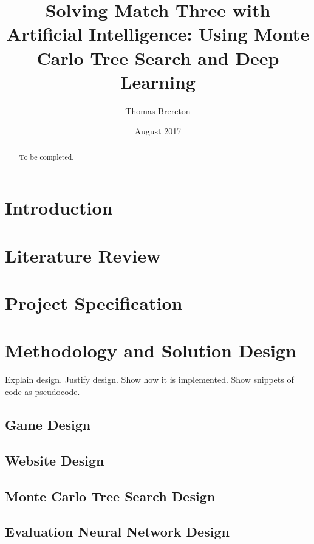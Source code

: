 \documentclass{bhamthesis}
\title{Solving Match Three with Artificial Intelligence: Using Monte Carlo Tree Search and Deep Learning}
\author{Thomas Brereton}
\date{August 2017}  %
\makeatletter
\theoremstyle{definition}
\newcommand{\makecrestcover}{%
\begin{titlepage}
\centering\singlespacing
\vspace*{1cm}
{\huge\bfseries University of Birmingham\par}
\vspace*{2cm}
\texttt{[image: crest]}\par
\vspace*{\stretch{1}}
{\Huge\bfseries
\@author\par
\vspace{1cm}
\@title\par}
\vspace*{\stretch{1}}
{\Large\@date\par}
\end{titlepage}
}
\makeatother
\begin{document}
\frontmatter

\maketitle


\begin{abstract}
To be completed.
\end{abstract}

\tableofcontents


\mainmatter
\chapter{Introduction}
\blindtext

\chapter{Literature Review}
\blindtext

\chapter{Project Specification}
\blindtext

\chapter{Methodology and Solution Design}
Explain design.
Justify design.
Show how it is implemented.
Show snippets of code as pseudocode.

\section{Game Design}
\blindtext

\section{Website Design}
\blindtext

\section{Monte Carlo Tree Search Design}
\blindtext

\section{Evaluation Neural Network Design}
\blindtext
\end{document}
